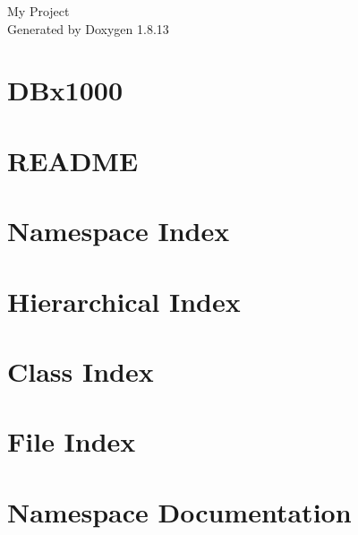 \documentclass[twoside]{book}
\newcommand{\+}{\discretionary{\mbox{\scriptsize$\hookleftarrow$}}{}{}}
\newcommand{\clearemptydoublepage}{%
  \newpage{\pagestyle{empty}\cleardoublepage}%
}
\begin{document}
\hypersetup{pageanchor=false,
             bookmarksnumbered=true,
             pdfencoding=unicode
            }
\begin{titlepage}
\vspace*{7cm}
\begin{center}%
{\Large My Project }\\
\vspace*{1cm}
{\large Generated by Doxygen 1.8.13}\\
\end{center}
\end{titlepage}
\clearemptydoublepage
{}
\tableofcontents
\clearemptydoublepage
{}
\hypersetup{pageanchor=true}

\chapter{D\+Bx1000}
\label{md_macrobench_README}

\chapter{R\+E\+A\+D\+ME}
\label{md_README}

\chapter{Namespace Index}

\chapter{Hierarchical Index}

\chapter{Class Index}

\chapter{File Index}

\chapter{Namespace Documentation}
















\end{document}
